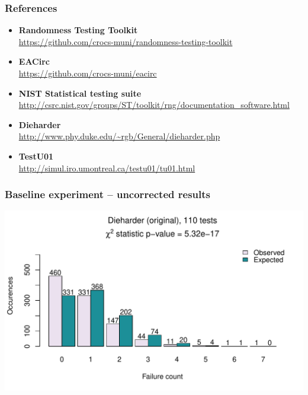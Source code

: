 \documentclass[aspectratio=169]{beamer}
\begin{document}
\begin{frame}

\frametitle{References}
\begin{itemize}
\item \textbf{Randomness Testing Toolkit} \\ \url{https://github.com/crocs-muni/randomness-testing-toolkit}
\item \textbf{EACirc} \\ \url{https://github.com/crocs-muni/eacirc}
\item \textbf{NIST Statistical testing suite} \\ \url{http://csrc.nist.gov/groups/ST/toolkit/rng/documentation_software.html}
\item \textbf{Dieharder} \\ \url{http://www.phy.duke.edu/~rgb/General/dieharder.php}
\item \textbf{TestU01} \\ \url{http://simul.iro.umontreal.ca/testu01/tu01.html}
\end{itemize}

\end{frame}


\begin{frame}
\frametitle{Baseline experiment -- uncorrected results}
\begin{nomar}
\centering
\includegraphics[width=.85\textwidth]{figures/dieharder-orig.pdf} 
\end{nomar}
\end{frame}
\end{document}
